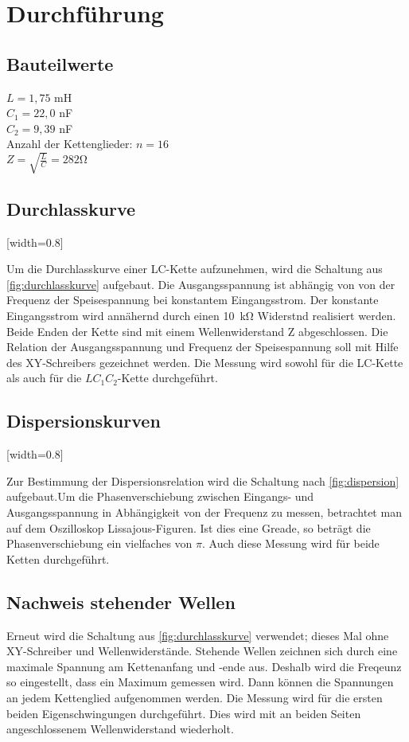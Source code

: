 \section{Durchführung}
\label{sec:Durchführung}

\subsection{Bauteilwerte}
$L = 1,75$ \si{\milli\henry} \\
$C_{1} = 22,0$ \si{\nano\farad} \\
$C_{2} = 9,39$ \si{\nano\farad} \\
Anzahl der Kettenglieder: $n = 16$ \\
$Z = \sqrt{\frac{L}{C}} = 282 \si{\ohm}$

\subsection{Durchlasskurve}

[width=0.8\textwidth]

Um die Durchlasskurve einer LC-Kette aufzunehmen, wird die Schaltung aus \ref{fig:durchlasskurve}
aufgebaut. Die Ausgangsspannung ist abhängig von von der Frequenz der Speisespannung bei konstantem Eingangsstrom. Der konstante Eingangsstrom wird annähernd durch einen \SI{10}{\kilo\ohm} Widerstnd realisiert werden. Beide Enden der Kette sind mit einem Wellenwiderstand Z abgeschlossen. Die Relation der Ausgangsspannung und Frequenz der Speisespannung soll mit Hilfe des XY-Schreibers gezeichnet werden.
Die Messung wird sowohl für die LC-Kette als auch für die $LC_{1}C_{2}$-Kette durchgeführt.

\subsection{Dispersionskurven}

[width=0.8\textwidth]

Zur Bestimmung der Dispersionsrelation wird die Schaltung nach \ref{fig:dispersion} aufgebaut.Um die Phasenverschiebung zwischen Eingangs- und Ausgangsspannung in Abhängigkeit von der Frequenz zu messen, betrachtet man auf dem Oszilloskop Lissajous-Figuren. Ist dies eine Greade, so beträgt die Phasenverschiebung ein vielfaches von $\pi$. Auch diese Messung wird für beide Ketten durchgeführt.

\subsection{Nachweis stehender Wellen}
Erneut wird die Schaltung aus \ref{fig:durchlasskurve} verwendet; dieses Mal ohne XY-Schreiber und Wellenwiderstände. Stehende Wellen zeichnen sich durch eine maximale Spannung am Kettenanfang und -ende aus. Deshalb wird die Freqeunz so eingestellt, dass ein Maximum gemessen wird. Dann können die Spannungen an jedem Kettenglied aufgenommen werden. Die Messung wird für die ersten beiden Eigenschwingungen durchgeführt.
Dies wird mit an beiden Seiten angeschlossenem Wellenwiderstand wiederholt.
